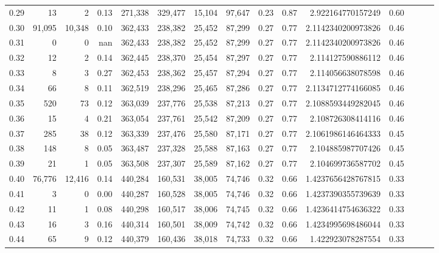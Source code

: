 \begin{tabular}{rrrrrrrrrrrrrrr}
0.29 &      13 &       2 &  0.13 &  271,338 &  329,477 &   15,104 &   97,647 &  0.23 &  0.87 &     2.922164770157249 &      0.60 \\
0.30 &  91,095 &  10,348 &  0.10 &  362,433 &  238,382 &   25,452 &   87,299 &  0.27 &  0.77 &    2.1142340200973826 &      0.46 \\
0.31 &       0 &       0 &   nan &  362,433 &  238,382 &   25,452 &   87,299 &  0.27 &  0.77 &    2.1142340200973826 &      0.46 \\
0.32 &      12 &       2 &  0.14 &  362,445 &  238,370 &   25,454 &   87,297 &  0.27 &  0.77 &     2.114127590886112 &      0.46 \\
0.33 &       8 &       3 &  0.27 &  362,453 &  238,362 &   25,457 &   87,294 &  0.27 &  0.77 &     2.114056638078598 &      0.46 \\
0.34 &      66 &       8 &  0.11 &  362,519 &  238,296 &   25,465 &   87,286 &  0.27 &  0.77 &    2.1134712774166085 &      0.46 \\
0.35 &     520 &      73 &  0.12 &  363,039 &  237,776 &   25,538 &   87,213 &  0.27 &  0.77 &    2.1088593449282045 &      0.46 \\
0.36 &      15 &       4 &  0.21 &  363,054 &  237,761 &   25,542 &   87,209 &  0.27 &  0.77 &     2.108726308414116 &      0.46 \\
0.37 &     285 &      38 &  0.12 &  363,339 &  237,476 &   25,580 &   87,171 &  0.27 &  0.77 &    2.1061986146464333 &      0.45 \\
0.38 &     148 &       8 &  0.05 &  363,487 &  237,328 &   25,588 &   87,163 &  0.27 &  0.77 &     2.104885987707426 &      0.45 \\
0.39 &      21 &       1 &  0.05 &  363,508 &  237,307 &   25,589 &   87,162 &  0.27 &  0.77 &     2.104699736587702 &      0.45 \\
0.40 &  76,776 &  12,416 &  0.14 &  440,284 &  160,531 &   38,005 &   74,746 &  0.32 &  0.66 &    1.4237656428767815 &      0.33 \\
0.41 &       3 &       0 &  0.00 &  440,287 &  160,528 &   38,005 &   74,746 &  0.32 &  0.66 &    1.4237390355739639 &      0.33 \\
0.42 &      11 &       1 &  0.08 &  440,298 &  160,517 &   38,006 &   74,745 &  0.32 &  0.66 &    1.4236414754636322 &      0.33 \\
0.43 &      16 &       3 &  0.16 &  440,314 &  160,501 &   38,009 &   74,742 &  0.32 &  0.66 &    1.4234995698486044 &      0.33 \\
0.44 &      65 &       9 &  0.12 &  440,379 &  160,436 &   38,018 &   74,733 &  0.32 &  0.66 &     1.422923078287554 &      0.33 \\

\end{tabular}
